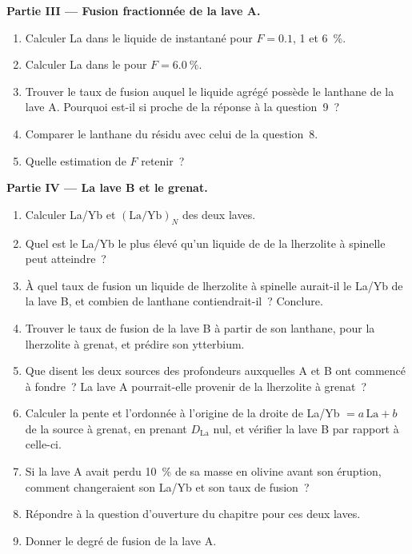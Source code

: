 \begin{problem}
\medskip\noindent\textbf{Partie III --- Fusion fractionnée de la lave A.}
\begin{enumerate}[resume]
\item Calculer La dans le liquide de  instantané pour $F = 0.1$, 1 et
\qty{6}{\percent}.
\item Calculer La dans le  pour $F = \qty{6.0}{\percent}$.
\item Trouver le taux de fusion auquel le liquide agrégé possède le
lanthane de la lave A. Pourquoi est-il si proche de la réponse à la question~9~?
\item Comparer le lanthane du résidu avec celui de la question~8.
\item Quelle estimation de $F$ retenir~?
\end{enumerate}

\medskip\noindent\textbf{Partie IV --- La lave B et le grenat.}
\begin{enumerate}[resume]
\item Calculer La/Yb et $(\mathrm{La}/\mathrm{Yb})_N$ des deux laves.
\item Quel est le La/Yb le plus élevé qu'un liquide de  de la lherzolite à spinelle
peut atteindre~?
\item À quel taux de fusion un liquide de lherzolite à spinelle aurait-il le La/Yb de
la lave B, et combien de lanthane contiendrait-il~? Conclure.
\item Trouver le taux de fusion de la lave B à partir de son lanthane, pour la lherzolite à grenat,
et prédire son ytterbium.
\item Que disent les deux sources des profondeurs auxquelles A et B ont commencé à
fondre~? La lave A pourrait-elle provenir de la lherzolite à grenat~?
\item Calculer la pente et l'ordonnée à l'origine de la droite de  La/Yb $= a\,
\mathrm{La} + b$ de la source à grenat, en prenant $D_{\mathrm{La}}$ nul,
et vérifier la lave B par rapport à celle-ci.
\item Si la lave A avait perdu \qty{10}{\percent} de sa masse en olivine avant
son éruption, comment changeraient son La/Yb et son taux de fusion~?
\item Répondre à la question d'ouverture du chapitre pour ces deux laves.
\item Donner le degré de fusion de la lave A.
\end{enumerate}
\end{problem}
